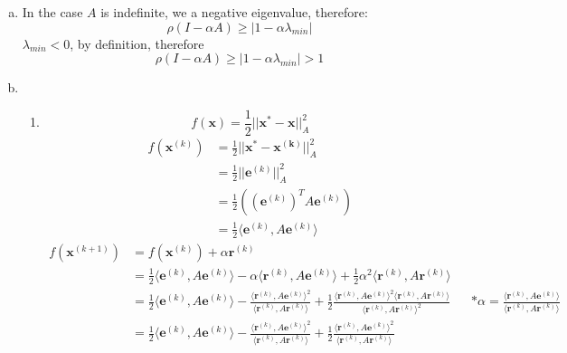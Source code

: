 \documentclass{article}
\begin{document}
\begin{enumerate}[(a)]
\begin{proof}
Thus,
\[max(|1-\alpha \lambda_{min}|, |1-\alpha \lambda_{max}|) < 1\]
So we get that:
\[\rho(I-\alpha A) < 1\]
\end{proof}
In our case:
\[\alpha = \frac{1}{||A||}\]
We know that for any induced norm:
\[||A|| > \rho(A) = \lambda_{max}\]
Thus,
\[\frac{1}{||A||} < \frac{1}{\lambda_{max}} < \frac{2}{\lambda_{max}}\]
Therefore, by \textbf{Lemma 1} we get that
\[\rho(I-\alpha A) < 1 \]
And the method converges.
\item In the case $A$ is indefinite, we a negative eigenvalue, therefore:
\[\rho(I-\alpha A)\ge |1-\alpha \lambda_{min}|\]
$\lambda_{min} < 0$, by definition, therefore
\[\rho(I-\alpha A)\ge |1-\alpha \lambda_{min}| > 1\]
\item
\begin{enumerate}[label=(\roman*)]
\item
\[f(\textbf{x}) = \frac{1}{2}||\textbf{x}^*-\textbf{x}||^2_A\]
\begin{align*}
f(\mathbf{x}^{(k)}) &=\frac{1}{2}||\mathbf{x}^*-\mathbf{x^{(k)}}||^2_A\\
&= \frac{1}{2}||\mathbf{e}^{(k)}||^2_A\\
&= \frac{1}{2}((\mathbf{e}^{(k)})^TA\mathbf{e}^{(k)})\\
&= \frac{1}{2}\langle \mathbf{e}^{(k)}, A\mathbf{e}^{(k)}\rangle
\end{align*}
\begin{align*}
f(\mathbf{x}^{(k+1)}) &= f(\mathbf{x}^{(k)}) + \alpha \mathbf{r}^{(k)}\\
&= \frac{1}{2}\langle\mathbf{e}^{(k)}, A\mathbf{e}^{(k)}\rangle - \alpha \langle\mathbf{r}^{(k)}, A\mathbf{e}^{(k)}\rangle +\frac{1}{2}\alpha^2\langle\mathbf{r}^{(k)}, A\mathbf{r}^{(k)}\rangle\\
&= \frac{1}{2}\langle\mathbf{e}^{(k)}, A\mathbf{e}^{(k)}\rangle - \frac{\langle\mathbf{r}^{(k)}, A\mathbf{e}^{(k)}\rangle^2}{\langle\mathbf{r}^{(k)}, A\mathbf{r}^{(k)}\rangle} + \frac{1}{2}\frac{\langle\mathbf{r}^{(k)}, A\mathbf{e}^{(k)}\rangle^2\langle\mathbf{r}^{(k)}, A\mathbf{r}^{(k)}\rangle}{\langle\mathbf{r}^{(k)}, A\mathbf{r}^{(k)}\rangle^2} && *\alpha = \frac{\langle\mathbf{r}^{(k)}, A\mathbf{e}^{(k)}\rangle}{\langle\mathbf{r}^{(k)}, A\mathbf{r}^{(k)}\rangle}\\
&= \frac{1}{2}\langle\mathbf{e}^{(k)}, A\mathbf{e}^{(k)}\rangle - \frac{\langle\mathbf{r}^{(k)}, A\mathbf{e}^{(k)}\rangle^2}{\langle\mathbf{r}^{(k)}, A\mathbf{r}^{(k)}\rangle} + \frac{1}{2}\frac{\langle\mathbf{r}^{(k)}, A\mathbf{e}^{(k)}\rangle^2}{\langle\mathbf{r}^{(k)}, A\mathbf{r}^{(k)}\rangle}\\

\end{align*}
\end{enumerate}
\end{enumerate}
\end{document}
